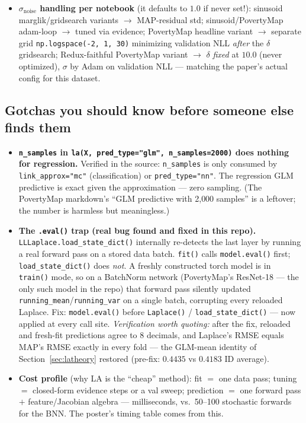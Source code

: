 \documentclass[10pt,a4paper]{article}
\newcommand{\code}[1]{\texttt{#1}}
\begin{document}
\begin{itemize}
\begin{itemize}
    growth of the gridsearch variants (huge $\delta\Rightarrow$ tiny $\Sigma$). The PovertyMap
    notebook therefore adds variants passing an explicit Gaussian-NLL loss
    (\code{loss=make\_gaussian\_nll\_loss(la)}, signature \code{loss(means, variances, targets)}),
    which \emph{does} see the variance and hence $\delta$.
  \end{itemize}
\item \textbf{$\sigma_{\text{noise}}$ handling per notebook} (it defaults to $1.0$ if never set!):
  sinusoid marglik/gridsearch variants $\to$ MAP-residual std; sinusoid/PovertyMap adam-loop
  $\to$ tuned via evidence; PovertyMap headline variant $\to$ separate grid
  \code{np.logspace(-2, 1, 30)} minimizing validation NLL \emph{after} the $\delta$ gridsearch;
  Redux-faithful PovertyMap variant $\to$ $\delta$ \emph{fixed} at $10.0$ (never optimized),
  $\sigma$ by Adam on validation NLL --- matching the paper's actual config for this dataset.
\end{itemize}

\subsection{Gotchas you should know before someone else finds them}
\begin{itemize}
\item \textbf{\code{n\_samples} in \code{la(X, pred\_type="glm", n\_samples=2000)} does nothing for
  regression.} Verified in the source: \code{n\_samples} is only consumed by
  \code{link\_approx="mc"} (classification) or \code{pred\_type="nn"}. The regression GLM
  predictive is exact given the approximation --- zero sampling. (The PovertyMap markdown's ``GLM
  predictive with 2{,}000 samples'' is a leftover; the number is harmless but meaningless.)
\item \textbf{The \code{.eval()} trap (real bug found and fixed in this repo).}
  \code{LLLaplace.load\_state\_dict()} internally re-detects the last layer by running a real
  forward pass on a stored data batch. \code{fit()} calls \code{model.eval()} first;
  \code{load\_state\_dict()} does \emph{not}. A freshly constructed torch model is in
  \code{train()} mode, so on a BatchNorm network (PovertyMap's ResNet-18 --- the only such model in
  the repo) that forward pass silently updated \code{running\_mean}/\code{running\_var} on a
  single batch, corrupting every reloaded Laplace. Fix: \code{model.eval()} before
  \code{Laplace()} / \code{load\_state\_dict()} --- now applied at every call site.
  \emph{Verification worth quoting:} after the fix, reloaded and fresh-fit predictions agree to
  8 decimals, and Laplace's RMSE equals MAP's RMSE exactly in every fold --- the GLM-mean identity
  of Section~\ref{sec:latheory} restored (pre-fix: $0.4435$ vs $0.4183$ ID average).
\item \textbf{Cost profile} (why LA is the ``cheap'' method): fit $=$ one data pass; tuning $=$
  closed-form evidence steps or a val sweep; prediction $=$ one forward pass $+$ feature/Jacobian
  algebra --- milliseconds, vs.\ 50--100 stochastic forwards for the BNN. The poster's timing
  table comes from this.
\end{itemize}
\end{document}
